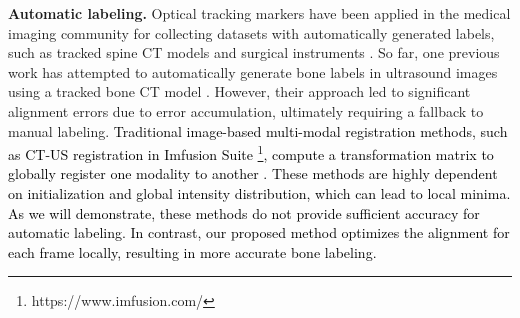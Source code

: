 \textbf{Automatic labeling.} Optical tracking markers have been applied in the medical imaging community for collecting datasets with automatically generated labels, such as tracked spine CT models \cite{spineDepth} and surgical instruments \cite{markerless_tool_tracking}. So far, one previous work has attempted to automatically generate bone labels in ultrasound images using a tracked bone CT model \cite{pcd3}. However, their approach led to significant alignment errors due to error accumulation, ultimately requiring a fallback to manual labeling. \textcolor{black}{Traditional image-based multi-modal registration methods, such as CT-US registration in Imfusion Suite \footnote{https://www.imfusion.com/}, compute a transformation matrix to globally register one modality to another \cite{CT-US_registration}. These methods are highly dependent on initialization and global intensity distribution, which can lead to local minima. As we will demonstrate, these methods do not provide sufficient accuracy for automatic labeling. In contrast, our proposed method optimizes the alignment for each frame locally, resulting in more accurate bone labeling.}




